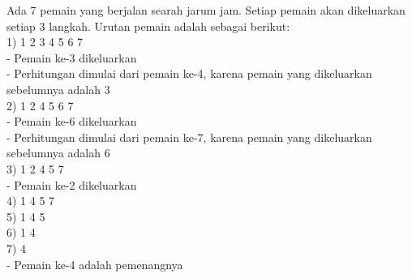 \documentclass{article}
\begin{document}
Ada 7 pemain yang berjalan searah jarum jam. Setiap pemain akan dikeluarkan setiap 3 langkah. Urutan pemain adalah sebagai berikut: \\
1) 1 2 3 4 5 6 7  \\
- Pemain ke-3 dikeluarkan \\
- Perhitungan dimulai dari pemain ke-4, karena pemain yang dikeluarkan sebelumnya adalah 3 \\
2) 1 2 4 5 6 7 \\
- Pemain ke-6 dikeluarkan \\
- Perhitungan dimulai dari pemain ke-7, karena pemain yang dikeluarkan sebelumnya adalah 6 \\
3) 1 2 4 5 7 \\
- Pemain ke-2 dikeluarkan \\
4) 1 4 5 7 \\
5) 1 4 5 \\
6) 1 4 \\
7) 4 \\
- Pemain ke-4 adalah pemenangnya
\end{document}
